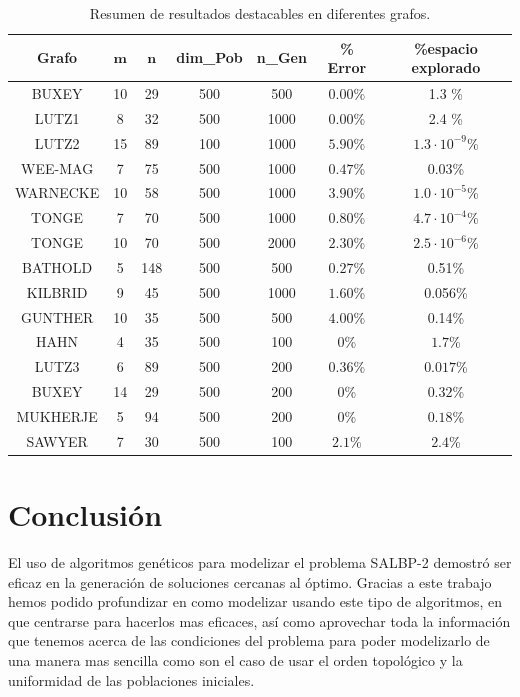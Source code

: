 \documentclass[12pt,a4paper]{report}
\begin{document}
    \begin{table}[H]
        \centering
        
        \label{tab:otros-resultados}
        \begin{tabular}{|c|c|c|c|c|c|c|}
            \hline
            \textbf{Grafo} & $\mathbf{m}$ &$\mathbf{n}$& \textbf{dim\_Pob} & \textbf{n\_Gen} & \textbf{\% Error} & \textbf{\%espacio explorado} \\
            \hline
            BUXEY      & 10 &29& 500 & 500  & $0.00$\%  & 1.3 \%\\
            LUTZ1      & 8  &32& 500 & 1000 & $0.00$\%  & 2.4 \%\\
            LUTZ2      & 15 &89& 100 & 1000 & $5.90$\%  & $1.3 \cdot 10^{-9}$\% \\
            WEE-MAG    & 7  &75& 500 & 1000 & $0.47$\%  & 0.03\% \\
            WARNECKE   & 10 &58& 500 & 1000 & $3.90$\%  & $1.0 \cdot 10^{-5}$\%\\
            TONGE      & 7  &70& 500 & 1000 & $0.80$\%  & $4.7 \cdot 10^{-4}$\% \\
            TONGE      & 10 &70& 500 & 2000 & $2.30$\%  & $2.5 \cdot 10^{-6}$\% \\
            BATHOLD    & 5  &148& 500 & 500  & $0.27$\%  & 0.51\% \\
            KILBRID    & 9  &45& 500 & 1000 & $1.60$\%  & 0.056\% \\
            GUNTHER    & 10 &35& 500 & 500  & $4.00$\%  & 0.14\% \\
            HAHN    & 4 &35& 500 & 100  & $0$\%  & $1.7$\%\\
            LUTZ3    & 6 &89& 500 & 200  & $0.36$\% & $0.017$\%  \\
            BUXEY   & 14 &29& 500 & 200  & $0$\% & $0.32$\%  \\
            MUKHERJE  & 5 &94& 500 & 200  & $0$\% & $0.18$\%  \\
            SAWYER  & 7 &30& 500 & 100  & $2.1$\% & $2.4$\%  \\
            \hline
        \end{tabular}
        \caption{Resumen de resultados destacables en diferentes grafos.}
    \end{table}

    \section{Conclusión}

    El uso de algoritmos genéticos para modelizar el problema SALBP-2 demostró ser eficaz en la generación de soluciones cercanas al óptimo. Gracias a este trabajo hemos podido profundizar en como modelizar usando este tipo de algoritmos, en que centrarse para hacerlos mas eficaces, así como aprovechar toda la información que tenemos acerca de las condiciones del problema para poder modelizarlo de una manera mas sencilla como son el caso de usar el orden topológico y la uniformidad de las poblaciones iniciales.

    
\end{document}
